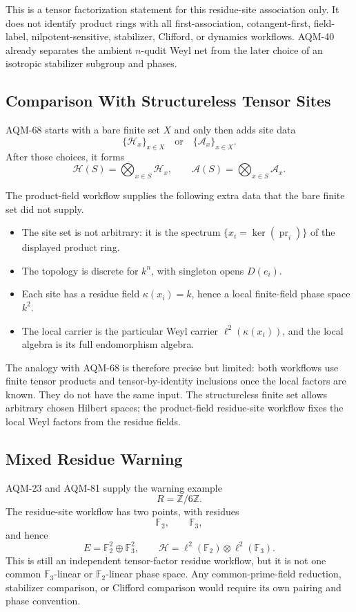 This is a tensor factorization statement for this residue-site association
only.  It does not identify product rings with all first-association,
cotangent-first, field-label, nilpotent-sensitive, stabilizer, Clifford, or
dynamics workflows.  AQM-40 already separates the ambient \(n\)-qudit Weyl
net from the later choice of an isotropic stabilizer subgroup and phases.

\subsection{Comparison With Structureless Tensor Sites}

AQM-68 starts with a bare finite set \(X\) and only then adds site data
\[
  \{\mathcal H_x\}_{x\in X}
  \quad\text{or}\quad
  \{\mathcal A_x\}_{x\in X}.
\]
After those choices, it forms
\[
  \mathcal H(S)=\bigotimes_{x\in S}\mathcal H_x,\qquad
  \mathcal A(S)=\bigotimes_{x\in S}\mathcal A_x.
\]

The product-field workflow supplies the following extra data that the bare
finite set did not supply.

\begin{itemize}
\item The site set is not arbitrary: it is the spectrum
  \(\{x_i=\ker(\operatorname{pr}_i)\}\) of the displayed product ring.
\item The topology is discrete for \(k^n\), with singleton opens \(D(e_i)\).
\item Each site has a residue field \(\kappa(x_i)=k\), hence a local
  finite-field phase space \(k^2\).
\item The local carrier is the particular Weyl carrier
  \(\ell^2(\kappa(x_i))\), and the local algebra is its full endomorphism
  algebra.
\end{itemize}

The analogy with AQM-68 is therefore precise but limited: both workflows use
finite tensor products and tensor-by-identity inclusions once the local
factors are known.  They do not have the same input.  The structureless
finite set allows arbitrary chosen Hilbert spaces; the product-field
residue-site workflow fixes the local Weyl factors from the residue fields.

\subsection{Mixed Residue Warning}

AQM-23 and AQM-81 supply the warning example
\[
  R=\mathbb Z/6\mathbb Z.
\]
The residue-site workflow has two points, with residues
\[
  \mathbb F_2,\qquad \mathbb F_3,
\]
and hence
\[
  E=\mathbb F_2^2\oplus\mathbb F_3^2,\qquad
  \mathcal H=\ell^2(\mathbb F_2)\otimes\ell^2(\mathbb F_3).
\]
This is still an independent tensor-factor residue workflow, but it is not
one common \(\mathbb F_3\)-linear or \(\mathbb F_2\)-linear phase space.  Any
common-prime-field reduction, stabilizer comparison, or Clifford comparison
would require its own pairing and phase convention.

